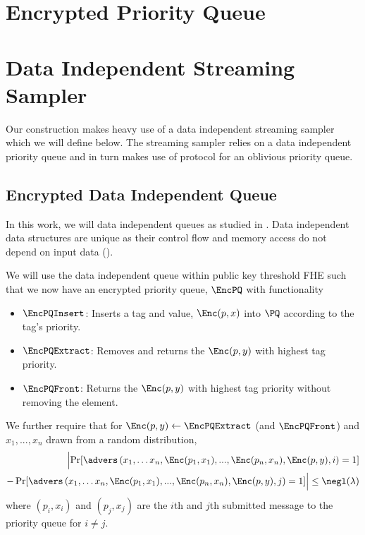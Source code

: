 \section{Encrypted Priority Queue}



\section{Data Independent Streaming Sampler}
\label{sec:streaming_sampler}
Our construction makes heavy use of a data independent streaming sampler which we will define below.
The streaming sampler relies on a data independent priority queue and in turn makes use of  protocol for an oblivious priority queue.

\subsection*{
	Encrypted Data Independent Queue
}
In this work, we will data independent queues as studied in \cite{toft2011secure, mitchell2014data, mazloom2023efficient}.
Data independent data structures are unique as their control flow and memory access do not depend on input data (\cite{mitchell2014data}).

We will use the data independent queue within public key threshold FHE such that we now have an encrypted priority queue, $\EncPQ$
with functionality
\begin{itemize}
	\item $\EncPQInsert$: Inserts a tag and value, $\Enc(p, x)$ into $\PQ$ according to the tag's priority.
	\item $\EncPQExtract$: Removes and returns the $\Enc(p, y)$ with highest tag priority.
	\item $\EncPQFront$: Returns the $\Enc(p, y)$ with highest tag priority without removing the element.
\end{itemize}

We further require that for $\Enc(p, y) \gets \EncPQExtract$ (and $\EncPQFront$) and $x_1, ..., x_n$ drawn from a random distribution,
\begin{align}
	\label{eq:gameEncPQ}
	\Bigl\lvert \Pr[\advers\left(x_1, \dots x_n, \Enc(p_1, x_1), ..., \Enc(p_n, x_n), \Enc(p, y), i\right) = 1] \\
	- \Pr[\advers\left(x_1, \dots x_n, \Enc(p_1, x_1), ..., \Enc(p_n, x_n), \Enc(p, y), j\right) = 1]
	\Bigr\rvert \leq \negl(\lambda) \notag
\end{align}
where $(p_i, x_i)$ and $(p_j, x_j)$ are the $i$th and $j$th submitted message to the priority queue for $i \neq j$.

